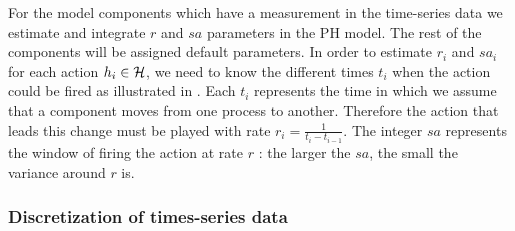 For the model components which have a measurement in the time-series data we estimate and integrate $r$ and $sa$ parameters in the PH model. 
The rest of the components will be 
assigned default parameters. In order to estimate $r_{i}$ and $sa_{i}$ for each action $h_{i} \in \mathcal{H}$, we need to know the different times $t_{i}$  when the action could be fired as illustrated 
in . Each  $t_{i}$ represents the time in which we assume that a component moves from one process to another. Therefore the action that leads this 
change must be played with rate $r_{i}=\frac{1}{t_{i}-t_{i-1}}$. The integer $sa$ represents the window of firing the action at rate $r$ : the larger the $sa$, the small the variance around $r$ is. 


\subsubsection{Discretization of times-series data}

